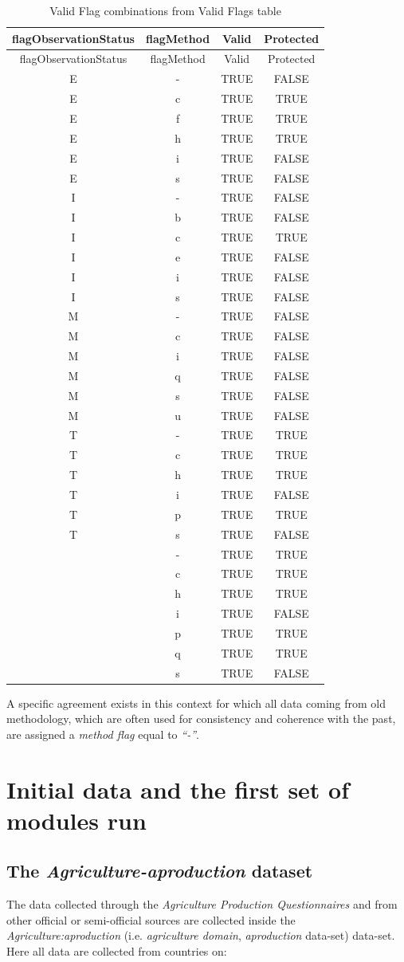 \documentclass[]{article}
\begin{document}
\begin{longtable}[]{@{}cccc@{}}
\caption{Valid Flag combinations from Valid Flags table}\tabularnewline
\toprule
flagObservationStatus & flagMethod & Valid & Protected\tabularnewline
\midrule
\endfirsthead
\toprule
flagObservationStatus & flagMethod & Valid & Protected\tabularnewline
\midrule
\endhead
E & - & TRUE & FALSE\tabularnewline
E & c & TRUE & TRUE\tabularnewline
E & f & TRUE & TRUE\tabularnewline
E & h & TRUE & TRUE\tabularnewline
E & i & TRUE & FALSE\tabularnewline
E & s & TRUE & FALSE\tabularnewline
I & - & TRUE & FALSE\tabularnewline
I & b & TRUE & FALSE\tabularnewline
I & c & TRUE & TRUE\tabularnewline
I & e & TRUE & FALSE\tabularnewline
I & i & TRUE & FALSE\tabularnewline
I & s & TRUE & FALSE\tabularnewline
M & - & TRUE & FALSE\tabularnewline
M & c & TRUE & FALSE\tabularnewline
M & i & TRUE & FALSE\tabularnewline
M & q & TRUE & FALSE\tabularnewline
M & s & TRUE & FALSE\tabularnewline
M & u & TRUE & FALSE\tabularnewline
T & - & TRUE & TRUE\tabularnewline
T & c & TRUE & TRUE\tabularnewline
T & h & TRUE & TRUE\tabularnewline
T & i & TRUE & FALSE\tabularnewline
T & p & TRUE & TRUE\tabularnewline
T & s & TRUE & FALSE\tabularnewline
& - & TRUE & TRUE\tabularnewline
& c & TRUE & TRUE\tabularnewline
& h & TRUE & TRUE\tabularnewline
& i & TRUE & FALSE\tabularnewline
& p & TRUE & TRUE\tabularnewline
& q & TRUE & TRUE\tabularnewline
& s & TRUE & FALSE\tabularnewline
\bottomrule
\end{longtable}

A specific agreement exists in this context for which all data coming
from old methodology, which are often used for consistency and coherence
with the past, are assigned a \emph{method flag} equal to \emph{``-''}.

\section{Initial data and the first set of modules
run}\label{initial-data-and-the-first-set-of-modules-run}

\subsection{\texorpdfstring{The \emph{Agriculture-aproduction}
dataset}{The Agriculture-aproduction dataset}}\label{the-agriculture-aproduction-dataset}

The data collected through the \emph{Agriculture Production
Questionnaires} and from other official or semi-official sources are
collected inside the \emph{Agriculture:aproduction} (i.e.
\emph{agriculture domain}, \emph{aproduction} data-set) data-set. Here
all data are collected from countries on:
\end{document}
